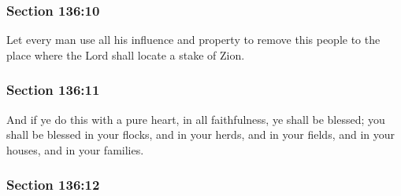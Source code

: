 
	\subsubsection{Section 136:10} %
		\label{DC136-10}

		Let every man use all his influence and property to remove this people to the place where the Lord shall locate a stake of Zion.


	\subsubsection{Section 136:11} %
		\label{DC136-11}

		And if ye do this with a pure heart, in all faithfulness, ye shall be blessed; you shall be blessed in your flocks, and in your herds, and in your fields, and in your houses, and in your families.


	\subsubsection{Section 136:12} %
		\label{DC136-12}

